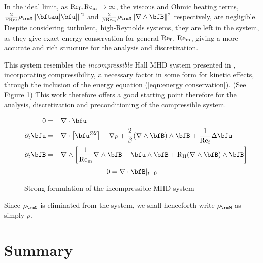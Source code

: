     In the ideal limit, as $\mathrm{Re}_{\mathrm{f}}, \mathrm{Re}_{\mathrm{m}}  \rightarrow  \infty$, the viscous and Ohmic heating terms, $\frac{2}{\beta\rmRef}\rho_{\rmM}\|\bftau[\bfu]\|^{2}$ and $\frac{2}{\beta\rmRem}\rho_{\rmM}\|\nabla\wedge\bfB\|^{2}$ respectively, are negligible. Despite considering turbulent, high-Reynolds systems, they are left in the system, as they give exact energy conservation for general $\mathrm{Re}_{\mathrm{f}}$, $\mathrm{Re}_{\mathrm{m}}$, giving a more accurate and rich structure for the analysis and discretization.

    This system resembles the \emph{incompressible} Hall MHD system presented in \cite{Laakmann_Hu_Farrell_2022}, incorporating compressibility, a necessary factor in some form for kinetic effects, through the inclusion of the energy equation (\ref{eqn:energy conservation}). (See Figure \ref{fig:incompressible strong form}) This work therefore offers a good starting point therefore for the analysis, discretization and preconditioning of the compressible system.

    \begin{figure}
        \centering
        \line
        \begin{align}
                           0  &=  - \nabla\cdot\bfu  \\
            \partial_{t}\bfu  &=  - \nabla\cdot\left[\bfu^{\otimes 2}\right] - \nabla p + \frac{2}{\beta}(\nabla\wedge\bfB)\wedge\bfB + \frac{1}{\rmRef}\Delta\bfu  \\
            \partial_{t}\bfB  &=  - \nabla\wedge\left[\frac{1}{\rmRem}\nabla\wedge\bfB - \bfu\wedge\bfB + \rmRH(\nabla\wedge\bfB)\wedge\bfB\right]
        \end{align}
        \shortline
        \begin{equation}
            0  =  \nabla\cdot\bfB|_{t = 0}
        \end{equation}
        \line
        \caption{Strong formulation of the incompressible MHD system}
        \label{fig:incompressible strong form}
    \end{figure}

    Since $\rho_{\rmC}$ is eliminated from the system, we shall henceforth write $\rho_{\rmM}$ as simply $\rho$.

    
    
    
    
    
    
    
    

    
    \section*{Summary}
    